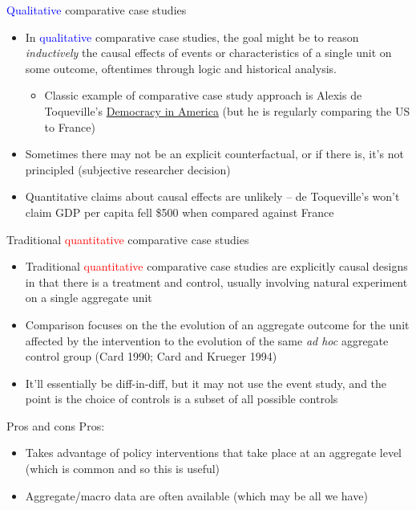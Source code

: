 \documentclass{beamer}
\begin{document}
\begin{frame}{\textcolor{blue}{Qualitative} comparative case studies}
	
	\begin{itemize}
	\item In \textcolor{blue}{qualitative} comparative case studies, the goal might be to reason \emph{inductively} the causal effects of events or characteristics of a single unit on some outcome, oftentimes through logic and historical analysis.  
		\begin{itemize}
		\item Classic example of comparative case study approach is Alexis de Toqueville's \underline{Democracy in America} (but he is regularly comparing the US to France)
		\end{itemize}
	\item Sometimes there may not be an explicit counterfactual, or if there is, it's not principled (subjective researcher decision)
	\item Quantitative claims about causal effects are unlikely -- de Toqueville's won't claim GDP per capita fell \$500 when compared against France
	\end{itemize}
\end{frame}

\begin{frame}{Traditional \textcolor{red}{quantitative} comparative case studies}

\begin{itemize}
	\item Traditional  \textcolor{red}{quantitative}  comparative case studies are explicitly causal designs in that there is a treatment and control, usually involving natural experiment on a single aggregate unit
	\item Comparison focuses on the the evolution of an aggregate outcome for the unit affected by the intervention to the evolution of the same \emph{ad hoc} aggregate control group (Card 1990; Card and Krueger 1994)
	\item It'll essentially be diff-in-diff, but it may not use the event study, and the point is the choice of controls is a subset of all possible controls
\end{itemize}

\end{frame}

\begin{frame}{Pros and cons}
	Pros:

		\begin{itemize}
		\item Takes advantage of policy interventions that take place at an aggregate level (which is common and so this is useful)
		\item Aggregate/macro data are often available (which may be all we have)
		\end{itemize}
\end{frame}
\end{document}

